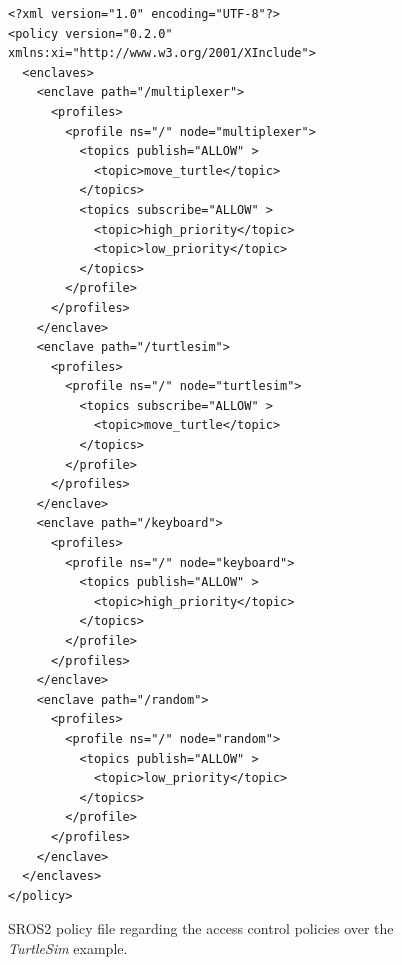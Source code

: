 \begin{figure}[H]
\begin{lstlisting}[otherkeywords = {xml, version, encoding, policy, version, enclave, enclaves, profile, profiles, topic, topics, xmlns:xi, path, ns, node, publish, subscribe, reply, request, call, execute, xi:include, href, xpointer}]
<?xml version="1.0" encoding="UTF-8"?>
<policy version="0.2.0" xmlns:xi="http://www.w3.org/2001/XInclude">
  <enclaves>
    <enclave path="/multiplexer">
      <profiles>
        <profile ns="/" node="multiplexer">
          <topics publish="ALLOW" >
            <topic>move_turtle</topic>
          </topics>
          <topics subscribe="ALLOW" >
            <topic>high_priority</topic>
            <topic>low_priority</topic>
          </topics>
        </profile>
      </profiles>
    </enclave>
    <enclave path="/turtlesim">
      <profiles>
        <profile ns="/" node="turtlesim">
          <topics subscribe="ALLOW" >
            <topic>move_turtle</topic>
          </topics>
        </profile>
      </profiles>
    </enclave>
    <enclave path="/keyboard">
      <profiles>
        <profile ns="/" node="keyboard">
          <topics publish="ALLOW" >
            <topic>high_priority</topic>
          </topics>
        </profile>
      </profiles>
    </enclave>
    <enclave path="/random">
      <profiles>
        <profile ns="/" node="random">
          <topics publish="ALLOW" >
            <topic>low_priority</topic>
          </topics>
        </profile>
      </profiles>
    </enclave>
  </enclaves>
</policy>
\end{lstlisting}
\caption{SROS2 policy file regarding the access control policies over the \textit{TurtleSim} example.}
\label{fig:ros-access-file}
\end{figure}